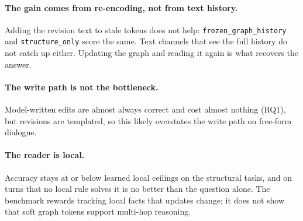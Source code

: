 \documentclass[11pt]{article}
\begin{document}
\paragraph{The gain comes from re-encoding, not from text history.}
Adding the revision text to stale tokens does not help: \texttt{frozen\_graph\_history} and \texttt{structure\_only} score the same.
Text channels that see the full history do not catch up either.
Updating the graph and reading it again is what recovers the answer.

\paragraph{The write path is not the bottleneck.}
Model-written edits are almost always correct and cost almost nothing (RQ1), but revisions are templated, so this likely overstates the write path on free-form dialogue.

\paragraph{The reader is local.}
Accuracy stays at or below learned local ceilings on the structural tasks, and on turns that no local rule solves it is no better than the question alone.
The benchmark rewards tracking local facts that updates change; it does not show that soft graph tokens support multi-hop reasoning.
\end{document}
